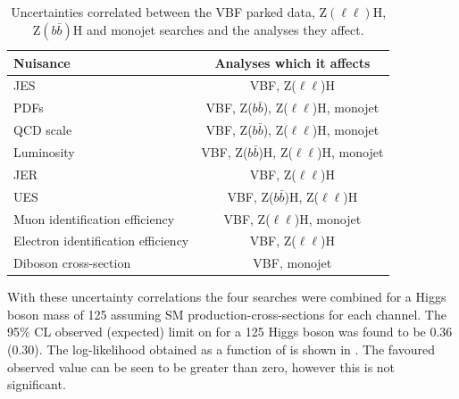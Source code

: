 \begin{table}
  \caption{Uncertainties correlated between the VBF parked data, Z$(\ell\ell)$H, Z$(b\bar{b})$H and monojet searches and the analyses they affect.}
  \label{tab:parkedcorrs}
  \begin{tabular}{|l|c|}
      \hline
      Nuisance & Analyses which it affects \\
      \hline
      \ac{JES} & VBF, Z($\ell\ell$)H \\
      PDFs & VBF, Z($b\bar{b}$), Z($\ell\ell$)H, monojet \\
      QCD scale & VBF, Z($b\bar{b}$), Z($\ell\ell$)H, monojet \\
      Luminosity & VBF, Z($b\bar{b}$)H, Z($\ell\ell$)H, monojet \\
      \ac{JER} & VBF, Z($\ell\ell$)H \\
      \ac{UES} & VBF, Z($b\bar{b}$)H, Z($\ell\ell$)H \\
      Muon identification efficiency & VBF, Z($\ell\ell$)H, monojet \\
      Electron identification efficiency & VBF, Z($\ell\ell$)H \\
      Diboson cross-section & VBF, monojet \\
      \hline
    \end{tabular}
\end{table}

With these uncertainty correlations the four searches were combined for a Higgs boson mass of 125 \GeV assuming \ac{SM} production-cross-sections for each channel. The 95\% \ac{CL} observed (expected) limit on \BRinv for a 125 \GeV Higgs boson was found to be 0.36 (0.30). The log-likelihood obtained as a function of \BRinv is shown in . The favoured observed value can be seen to be greater than zero, however this is not significant.

